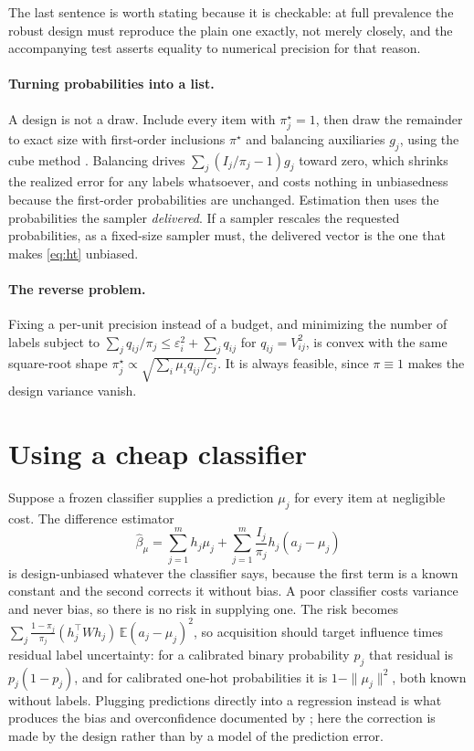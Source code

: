 \documentclass[11pt]{article}
\newcommand{\E}{\mathbb{E}}
\theoremstyle{plain}
\theoremstyle{remark}
\begin{document}
The last sentence is worth stating because it is checkable: at full prevalence the robust design must reproduce the plain one exactly, not merely closely, and the accompanying test asserts equality to numerical precision for that reason.

\paragraph{Turning probabilities into a list.} A design is not a draw. Include every item with $\pi_j^\star=1$, then draw the remainder to exact size with first-order inclusions $\pi^\star$ and balancing auxiliaries $g_j$, using the cube method \citep{DevilleTille2004}. Balancing drives $\sum_j(I_j/\pi_j-1)g_j$ toward zero, which shrinks the realized error for any labels whatsoever, and costs nothing in unbiasedness because the first-order probabilities are unchanged. Estimation then uses the probabilities the sampler \emph{delivered}. If a sampler rescales the requested probabilities, as a fixed-size sampler must, the delivered vector is the one that makes \eqref{eq:ht} unbiased.

\paragraph{The reverse problem.} Fixing a per-unit precision instead of a budget, and minimizing the number of labels subject to $\sum_j q_{ij}/\pi_j\le\varepsilon_i^2+\sum_j q_{ij}$ for $q_{ij}=V_{ij}^2$, is convex with the same square-root shape $\pi_j^\star\propto\sqrt{\sum_i\mu_iq_{ij}/c_j}$. It is always feasible, since $\pi\equiv 1$ makes the design variance vanish.

\section{Using a cheap classifier}

Suppose a frozen classifier supplies a prediction $\mu_j$ for every item at negligible cost. The difference estimator
\begin{equation}
\label{eq:diff}
\widehat\beta_\mu=\sum_{j=1}^m h_j\mu_j+\sum_{j=1}^m\frac{I_j}{\pi_j}h_j(a_j-\mu_j)
\end{equation}
is design-unbiased whatever the classifier says, because the first term is a known constant and the second corrects it without bias. A poor classifier costs variance and never bias, so there is no risk in supplying one. The risk becomes $\sum_j\frac{1-\pi_j}{\pi_j}(h_j^\top Wh_j)\,\E(a_j-\mu_j)^2$, so acquisition should target influence times residual label uncertainty: for a calibrated binary probability $p_j$ that residual is $p_j(1-p_j)$, and for calibrated one-hot probabilities it is $1-\|\mu_j\|^2$, both known without labels. Plugging predictions directly into a regression instead is what produces the bias and overconfidence documented by \citet{FongTyler2021}; here the correction is made by the design rather than by a model of the prediction error.
\end{document}
